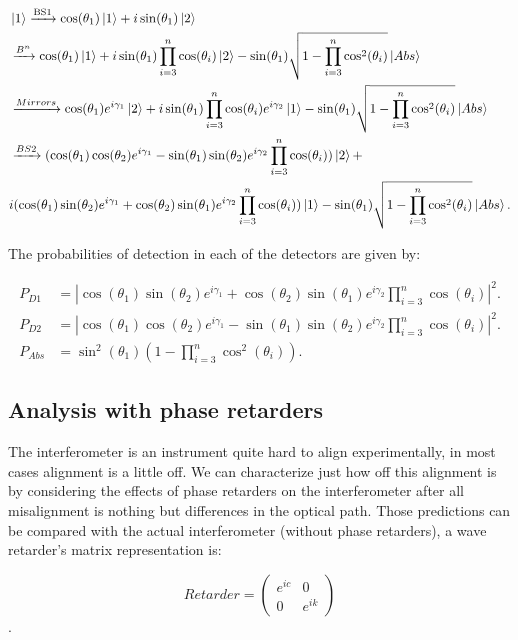 \documentclass[12pt]{book}
\begin{document}
\begin{align*}
&\ket{1}\xrightarrow{\text{BS1}}\cos(\theta_{1})\ket{1}+i\sin(\theta_{1})\ket{2}\\ &\xrightarrow{{B^{n}}}\cos(\theta_{1})\ket{1}+i\sin(\theta_{1})\prod_{i=3}^{n} \cos(\theta_{i})\ket{2}-\sin(\theta_{1})\sqrt{1-\prod_{i=3}^{n}\cos^2(\theta_{i})}\ket{Abs} \\ & \xrightarrow{{Mirrors}}\cos(\theta_{1})  e^{i \gamma_{1}}\ket{2}+i\sin(\theta_{1})\prod_{i=3}^{n} \cos(\theta_{i}) e^{i \gamma_{2}}\ket{1}-\sin(\theta_{1})\sqrt{1-\prod_{i=3}^{n}\cos^2(\theta_{i})}\ket{Abs} \\ & \xrightarrow{{BS2}}(\cos(\theta_{1})\cos(\theta_{2})e^{i \gamma_{1}}-\sin(\theta_{1})\sin(\theta_{2})e^{i \gamma_{2}}\prod_{i=3}^{n} \cos(\theta_{i}))\ket{2}+\\ & i(\cos(\theta_{1})\sin(\theta_{2})e^{i \gamma_{1}}+\cos(\theta_{2})\sin(\theta_{1})e^{i \gamma_{2}}\prod_{i=3}^{n} \cos(\theta_{i}))\ket{1}-\sin(\theta_{1})\sqrt{1-\prod_{i=3}^{n}\cos^2(\theta_{i})}\ket{Abs}.
\end{align*}
 
The probabilities of detection in each of the detectors are given by:

\begin{align}
P_{D1}&=|\cos(\theta_{1})\sin(\theta_{2})e^{i \gamma_{1}}+\cos(\theta_{2})\sin(\theta_{1})e^{i \gamma_{2}}\prod_{i=3}^{n} \cos(\theta_{i})|^2.\\
P_{D2}&=|\cos(\theta_{1})\cos(\theta_{2})e^{i \gamma_{1}}-\sin(\theta_{1})\sin(\theta_{2})e^{i \gamma_{2}}\prod_{i=3}^{n} \cos(\theta_{i})|^2.\\
P_{Abs}&=\sin^2(\theta_{1})\left(1-\prod_{i=3}^{n}\cos^2(\theta_{i})\right).
\end{align}

\subsection{Analysis with phase retarders }

The interferometer is an instrument quite hard to align experimentally, in most cases alignment is a little off. We can characterize just how off this alignment is by considering the effects of phase retarders on the interferometer after all misalignment is nothing but differences in the optical path. Those predictions can be compared with the actual interferometer (without phase retarders), a wave retarder's  matrix representation is:


\begin{equation}
 Retarder=\begin
{pmatrix} e^
{i c} & 0\\0& e^
{i k }\end
{pmatrix}
\end{equation}.
\end{document}
